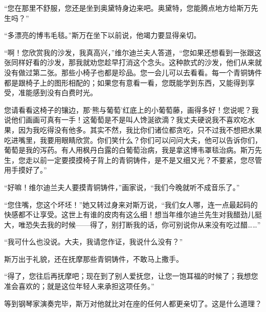 \par “您在那里不舒服，您还是坐到奥黛特身边来吧。奥黛特，您能腾点地方给斯万先生吗？”
\par “多漂亮的博韦毛毯。”斯万在坐下以前说，他竭力要显得亲切。
\par “啊！您欣赏我的沙发，我真高兴，”维尔迪兰夫人答道，“您如果还想看到一张跟这张同样好看的沙发，那我就劝您趁早打消这个念头。这种款式的沙发，他们从来就没有做过第二张。那些小椅子也都是珍品。您一会儿可以去看看。每一个青铜铸件都是跟椅子上的图形相配的；如果您有意看一看，您既能学到东西，又能得到享受，准能感到没有白费时光。
\par 您请看看这椅子的镶边，那‘熊与葡萄’红底上的小葡萄藤，画得多好！您说呢？我说他们画画可真有一手！这葡萄是不是叫人馋涎欲滴？我丈夫硬说我不喜欢吃水果，因为我吃得没有他多。其实不然，我比你们诸位都贪吃，只不过我不想把水果吃进嘴里，我要用眼睛欣赏。你们笑什么？你们可以问问大夫，他可以告诉你们，葡萄是我的泻药。有人用枫丹白露的白葡萄治病，我是拿这博韦罩毯治病。斯万先生，您走以前一定要摸摸椅子背上的青铜铸件，是不是又细又光？不要紧，您尽管用手摸好了。”
\par “好嘛！维尔迪兰夫人要摸青铜铸件，”画家说，“我们今晚就听不成音乐了。”
\par “您住嘴，您这个坏坯！”她又转过身来对斯万说，“我们女人哪，连一点最起码的快感都不让享受。这世上有谁的皮肉有这么细！想当年维尔迪兰先生对我醋劲儿挺大，唯恐失去我的时候——得了，别打断我的话，你可别说你从来没有吃过醋……”
\par “我可什么也没说。大夫，我请您作证，我说什么没有？”
\par 斯万出于礼貌，还在抚摩那些青铜铸件，不敢马上撒手。
\par “得了，您往后再抚摩吧；现在到了别人爱抚您，让您一饱耳福的时候了；我想您准会喜欢的；就是这位年轻人来承担这项任务。”
\par 等到钢琴家演奏完毕，斯万对他就比对在座的任何人都更亲切了。这是什么道理？
